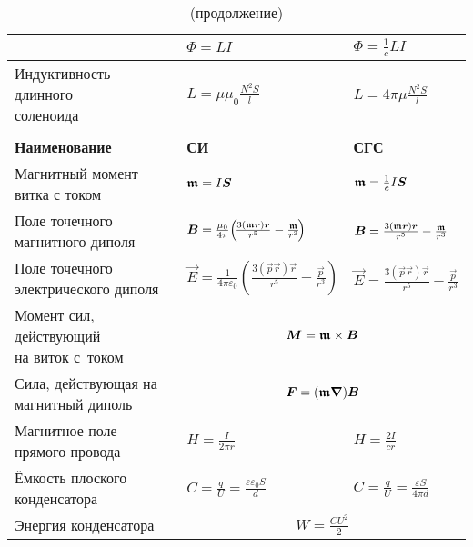 \begin{booksupplement}
\begin{longtable}{p{40mm}p{30mm}p{30mm}}
        & $\Phi=LI$	&    $\Phi=\frac{1}{c}LI$	\bigstrut\\ \hline
\parbox{40mm}{Индуктивность длинного\\[-2.5pt] соленоида}
        & $L=\mu\mu_0\frac{N^2S}{l}$    &   $L=4\pi\mu \frac{N^2S}{l}$	\bigstrut\\ \hline
\newpage
\caption[]{\hfill(продолжение)} \\
\toprule[1pt]
\textbf{Наименование} & \textbf{СИ} & \textbf{СГС} \\
\midrule[1pt]
\parbox{40mm}{Магнитный момент\\[-2.5pt] витка с током}
        & ${\boldsymbol{\mathfrak{m}  }}=I{\boldsymbol{S}}$		&   ${\boldsymbol{\mathfrak{m}  }}=\frac{1}{c}I{\boldsymbol{S}}$	\bigstrut\\ \hline
\parbox{40mm}{Поле точечного\\[-2.5pt] магнитного диполя}
        & ${\boldsymbol{B}}=\frac{\mu_0}{4\pi}\!\left(\!\frac{3({\boldsymbol{\mathfrak{m}}}{\boldsymbol{r}}){\boldsymbol{r}}}{r^5}-\frac{{\boldsymbol{\mathfrak{m}}}}{r^3}\!\right)$
        & ${\boldsymbol{B}}=\frac{3({\boldsymbol{\mathfrak{m}}}{\boldsymbol{r}}){\boldsymbol{r}}}{r^5}-\frac{{\boldsymbol{\mathfrak{m}}}}{r^3}$ \bigstrut\\ \hline
\parbox{40mm}{Поле точечного\\[-2.5pt] электрического диполя}
        & $\vec{E}=\frac{1}{4\pi\varepsilon_0}\!\left(\!\frac{3(\vec{p}\vec{r})\vec{r}}{r^5}-\frac{\vec{p}}{r^3}\!\right)$
        & $\vec{E}=\frac{3(\vec{p}\vec{r})\vec{r}}{r^5}-\frac{\vec{p}}{r^3}$ \bigstrut\\ \hline
\parbox{40mm}{Момент сил, действующий\\[-2.5pt] на виток с~током}
        & \bigstrut\\ \hline
\parbox{40mm}{Сила, действующая на\\[-2.5pt] магнитный диполь}
        &  \bigstrut\\ \hline
\parbox{40mm}{Магнитное поле\\[-2.pt] прямого провода}
    & $H = \frac{I}{2\pi r}$ & $H=\frac{2I}{cr}$ \bigstrut \\ \hline
\parbox{40mm}{Ёмкость плоского\\[-2.5pt] конденсатора}
        & $C=\frac{q}{U}=\frac{\varepsilon\varepsilon_0S}{d}$
        & $C=\frac{q}{U}=\frac{\varepsilon S}{4\pi d}$ \bigstrut \\ \hline
Энергия конденсатора
        &  \bigstrut\\
\bottomrule[1pt]
\end{longtable}
\endgroup


\end{booksupplement}
